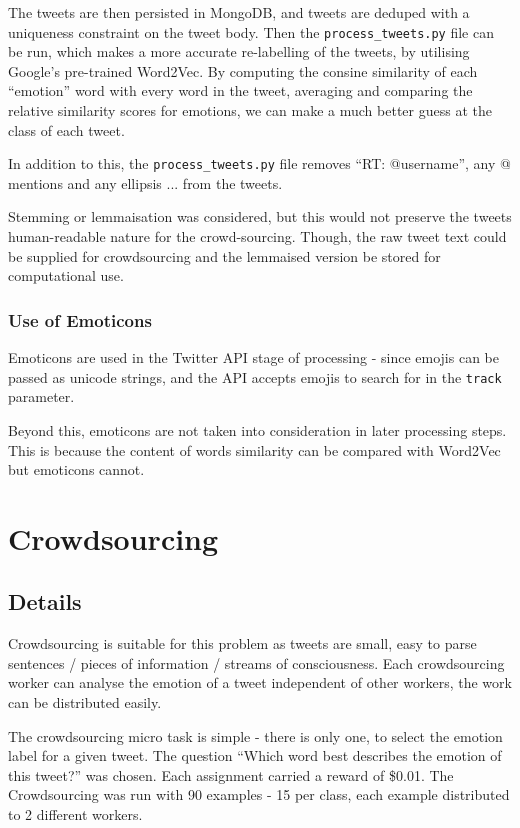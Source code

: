 \documentclass{mproj}
\begin{document}
The tweets are then persisted in MongoDB, and tweets are deduped with a uniqueness constraint on the tweet body. Then the \lstinline{process_tweets.py} file can be run, which makes a more accurate re-labelling of the tweets, by utilising Google's pre-trained Word2Vec. By computing the consine similarity of each ``emotion'' word with every word in the tweet, averaging and comparing the relative similarity scores for emotions, we can make a much better guess at the class of each tweet.

In addition to this, the \lstinline{process_tweets.py} file removes ``RT: @username'', any @ mentions and any ellipsis ... from the tweets.

Stemming or lemmaisation was considered, but this would not preserve the tweets human-readable nature for the crowd-sourcing. Though, the raw tweet text could be supplied for crowdsourcing and the lemmaised version be stored for computational use.

\subsubsection{Use of Emoticons}

Emoticons are used in the Twitter API stage of processing - since emojis can be passed as unicode strings, and the API accepts emojis to search for in the \lstinline{track} parameter.

Beyond this, emoticons are not taken into consideration in later processing steps. This is because the content of words similarity can be compared with Word2Vec but emoticons cannot.


\section{Crowdsourcing}
\subsection{Details}

Crowdsourcing is suitable for this problem as tweets are small, easy to parse sentences / pieces of information / streams of consciousness. Each crowdsourcing worker can analyse the emotion of a tweet independent of other workers, the work can be distributed easily.

The crowdsourcing micro task is simple - there is only one, to select the emotion label for a given tweet. The question ``Which word best describes the emotion of this tweet?'' was chosen. Each assignment carried a reward of \$0.01.  The Crowdsourcing was run with 90 examples - 15 per class, each example distributed to 2 different workers.
\end{document}
